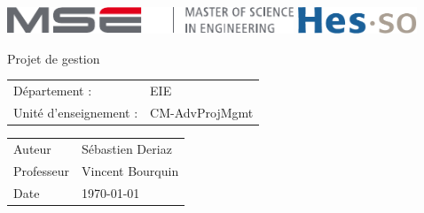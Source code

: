 \documentclass[]{article}
\newcommand{\Author}{Sébastien Deriaz}
\newcommand{\professor}{Vincent Bourquin}
\newcommand{\cours}{CM-AdvProjMgmt}
\newcommand{\titre}{Projet de gestion}
\begin{document}
\thispagestyle{empty}

\begin{center}
\includegraphics[height=8mm]{mse-full-cropped.pdf}
\hfill
\includegraphics[height=8mm]{HES-SO_logo_Pantone.pdf}
\end{center}
\vfill
\begin{center}
\Huge \titre
\end{center}
\begin{center}
\large
\begin{tabular}{ll}
Département : & EIE\\
Unité d'enseignement : & \cours
\end{tabular}
\end{center}
\vfill
\begin{center}
\large
\begin{tabular}{ll}
\Large Auteur & \Large \Author\\
Professeur & \professor\\ 
Date & \today
\end{tabular}
\end{center}
\vfill

\pagebreak
\tableofcontents
\pagebreak



\pagebreak

\pagebreak





\end{document}
